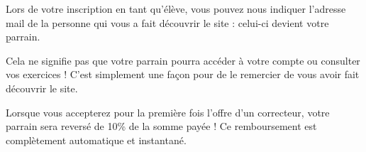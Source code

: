 Lors de votre inscription en tant qu'élève, vous pouvez nous indiquer l'adresse mail de la personne qui vous a fait découvrir le site : celui-ci devient votre \b{parrain}.

Cela ne signifie pas que votre parrain pourra accéder à votre compte ou consulter vos exercices ! C'est simplement une façon pour \eDevoir de le remercier de vous avoir fait découvrir le site.

Lorsque vous accepterez pour la première fois l'offre d'un correcteur, votre parrain sera reversé de 10\% de la somme payée ! Ce remboursement est complètement automatique et instantané. 